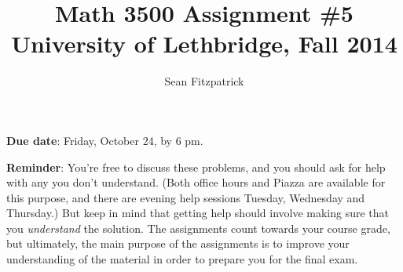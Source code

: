 \documentclass[letterpaper,12pt]{article}
\title{Math 3500 Assignment \#5\\University of Lethbridge, Fall 2014}
\author{Sean Fitzpatrick}
\begin{document}
 \maketitle

{\bf Due date}: Friday, October 24, by 6 pm.

\bigskip

{\bf Reminder}: You're free to discuss these problems, and you should ask for help with any you don't understand. (Both office hours and Piazza are available for this purpose, and there are evening help sessions Tuesday, Wednesday and Thursday.) But keep in mind that getting help should involve making sure that you {\em understand} the solution. The assignments count towards your course grade, but ultimately, the main purpose of the assignments is to improve your understanding of the material in order to prepare you for the final exam.
\end{document}

